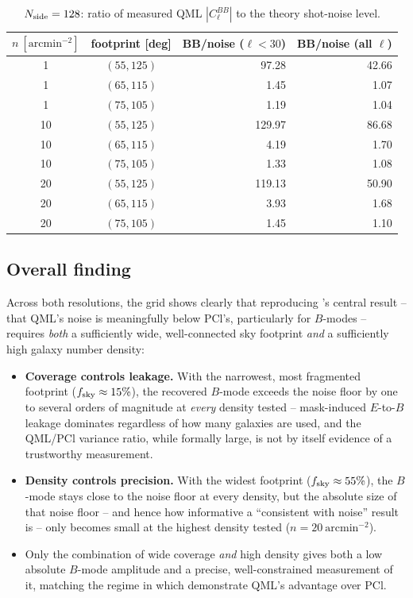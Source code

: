 \documentclass[11pt]{article}
\begin{document}
\begin{table}[H]
\centering
\begin{tabular}{ccrr}
\toprule
$n\ [\mathrm{arcmin}^{-2}]$ & footprint [deg] & BB/noise ($\ell<30$) & BB/noise (all $\ell$) \\
\midrule
1  & $(55,125)$ & 97.28  & 42.66 \\
1  & $(65,115)$ &  1.45  &  1.07 \\
1  & $(75,105)$ &  1.19  &  1.04 \\
10 & $(55,125)$ & 129.97 & 86.68 \\
10 & $(65,115)$ &  4.19  &  1.70 \\
10 & $(75,105)$ &  1.33  &  1.08 \\
20 & $(55,125)$ & 119.13 & 50.90 \\
20 & $(65,115)$ &  3.93  &  1.68 \\
20 & $(75,105)$ &  1.45  &  1.10 \\
\bottomrule
\end{tabular}
\caption{$N_{\rm side}=128$: ratio of measured QML $|C_\ell^{BB}|$ to the theory
shot-noise level.}
\label{tab:bbnoise128}
\end{table}

\subsection{Overall finding}

Across both resolutions, the grid shows clearly that reproducing \citet{Maraio2022}'s
central result -- that QML's noise is meaningfully below PCl's, particularly for
$B$-modes -- requires \emph{both} a sufficiently wide, well-connected sky footprint
\emph{and} a sufficiently high galaxy number density:
\begin{itemize}
\item \textbf{Coverage controls leakage.} With the narrowest, most fragmented footprint
($f_{\rm sky}\approx15\%$), the recovered $B$-mode exceeds the noise floor by one to
several orders of magnitude at \emph{every} density tested -- mask-induced $E$-to-$B$
leakage dominates regardless of how many galaxies are used, and the QML/PCl variance
ratio, while formally large, is not by itself evidence of a trustworthy measurement.
\item \textbf{Density controls precision.} With the widest footprint
($f_{\rm sky}\approx55\%$), the $B$-mode stays close to the noise floor at every
density, but the absolute size of that noise floor -- and hence how informative a
``consistent with noise'' result is -- only becomes small at the highest density tested
($n=20\ \mathrm{arcmin}^{-2}$).
\item Only the combination of wide coverage \emph{and} high density gives both a low
absolute $B$-mode amplitude and a precise, well-constrained measurement of it, matching
the regime in which \citet{Maraio2022} demonstrate QML's advantage over PCl.
\end{itemize}
\end{document}
